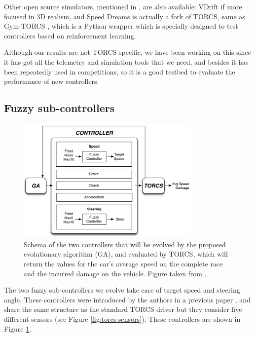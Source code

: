 \documentclass[10pt,journal,compsoc]{IEEEtran}
\begin{document}
Other open source simulators, mentioned in \cite{Loiacono:2012:LEA:2212908.2212953}, are also available: VDrift
if more focused in 3D realism, and Speed Dreams is actually a fork of
TORCS, same as Gym-TORCS \cite{yoshida2016gym}, which is a Python
wrapper which is specially designed to test controllers based on
reinforcement learning.

Although our results are not TORCS specific, we have been
working on this since it has got all the telemetry and simulation
tools that we need, and besides it has been repeatedly used in
competitions, so it is a good testbed to evaluate the performance of new controllers.



\subsection{Fuzzy sub-controllers}
\label{subsec:fuzzy-controllers}

\begin{figure}[!ht]
  \label{fig:ga}
  \begin{center}
    \includegraphics[width=9cm]{fig/flowchart}
  \end{center}
  \caption{Schema of the two controllers that will be evolved by the proposed 
    evolutionary algorithm (GA), and evaluated by TORCS, which will
    return the values for the car's average speed on the complete race and the incurred damage on the vehicle. Figure taken from \cite{salem_evo18}.}
\end{figure}
%
The two fuzzy sub-controllers we evolve take care of target speed and steering angle. These controllers were introduced by the authors in a previous paper \cite{DBLP:conf/evoW/SalemMMG17}, and share the same structure as the standard TORCS driver but they consider five different sensors (see Figure \ref{fig:torcs-sensors}). These controllers are shown in Figure \ref{fig:ga}. 
\end{document}
